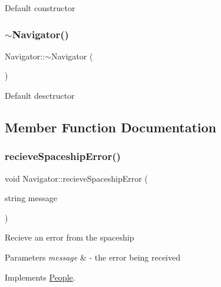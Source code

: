 Default constructor \mbox{\label{classNavigator_a81bb9c10588736497700032d8b61e9d1}} 
\subsubsection{\texorpdfstring{$\sim$\+Navigator()}{~Navigator()}}
{\footnotesize\ttfamily Navigator\+::$\sim$\+Navigator (\begin{DoxyParamCaption}{ }\end{DoxyParamCaption})\hspace{0.3cm}{\ttfamily [inline]}}

Default desctructor 

\subsection{Member Function Documentation}
\mbox{\label{classNavigator_a7dc06965001f658cff3c5f0dcac39def}} 
\subsubsection{\texorpdfstring{recieve\+Spaceship\+Error()}{recieveSpaceshipError()}}
{\footnotesize\ttfamily void Navigator\+::recieve\+Spaceship\+Error (\begin{DoxyParamCaption}\item[{string}]{message }\end{DoxyParamCaption})\hspace{0.3cm}{\ttfamily [virtual]}}

Recieve an error from the spaceship 
\begin{DoxyParams}{Parameters}
{\em message} & -\/ the error being received \\
\hline
\end{DoxyParams}


Implements \hyperlink{classPeople_a0685df78be631783138865e03cc7c85d}{People}.

\mbox{\label{classNavigator_a72ce12655f579879aae63b118c906b91}} 

